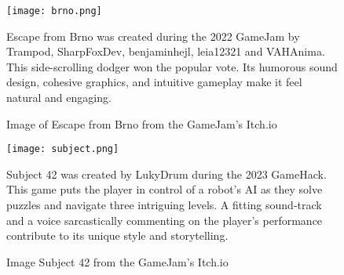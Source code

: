 \begin{figure}[H]
    \texttt{[image: brno.png]}
    \caption{Image of Escape from Brno from the GameJam's Itch.io~\cite{itch_brno}}
    \label{fig:brno-picture}
    Escape from Brno was created during the 2022 GameJam by Trampod, SharpFoxDev, benjaminhejl, leia12321 and VAHAnima. This side-scrolling dodger won the popular vote. Its humorous sound design, cohesive graphics, and intuitive gameplay make it feel natural and engaging. \cite{itch_brno}
\end{figure}

\begin{figure}[H]
    \texttt{[image: subject.png]}
    \caption{Image Subject 42 from the GameJam's Itch.io~\cite{itch_subject}}
    \label{fig:subject-picture}
    Subject 42 was created by LukyDrum during the 2023 GameHack. This game puts the player in control of a robot’s AI as they solve puzzles and navigate three intriguing levels. A fitting sound-track and a voice sarcastically commenting on the player’s performance contribute to its unique style and storytelling. \cite{itch_subject}
\end{figure}
